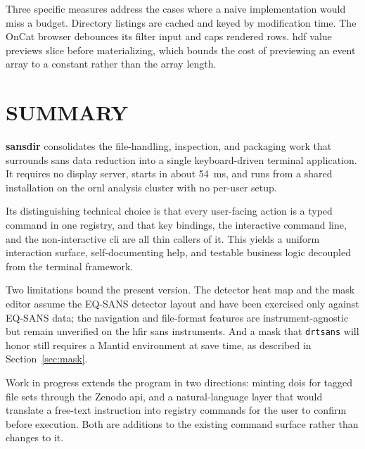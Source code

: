 \documentclass[tm]{ornltm}
\begin{document}
Three specific measures address the cases where a naive implementation would
miss a budget. Directory listings are cached and keyed by modification time.
The OnCat browser debounces its filter input and caps rendered rows. \Ac{hdf}
value previews slice before materializing, which bounds the cost of previewing an
event array to a constant rather than the array length.

\section{SUMMARY}
\label{sec:future}

\textbf{sansdir} consolidates the file-handling, inspection, and packaging work
that surrounds \ac{sans} data reduction into a single keyboard-driven terminal
application. It requires no display server, starts in about 54~ms, and runs from
a shared installation on the \ac{ornl} analysis cluster with no per-user setup.

Its distinguishing technical choice is that every user-facing action is a typed
command in one registry, and that key bindings, the interactive command line, and
the non-interactive \ac{cli} are all thin callers of it. This yields a uniform
interaction surface, self-documenting help, and testable business logic decoupled
from the terminal framework.

Two limitations bound the present version. The detector heat map and the mask
editor assume the EQ-SANS detector layout and have been exercised only against
EQ-SANS data; the navigation and file-format features are instrument-agnostic
but remain unverified on the \ac{hfir} \ac{sans} instruments. And a mask that
\texttt{drtsans} will honor still requires a Mantid environment at save time, as
described in Section~\ref{sec:mask}.

Work in progress extends the program in two directions: minting \acp{doi} for
tagged file sets through the Zenodo \ac{api}, and a natural-language layer that
would translate a free-text instruction into registry commands for the user to
confirm before execution. Both are additions to the existing command surface
rather than changes to it.

\end{document}
